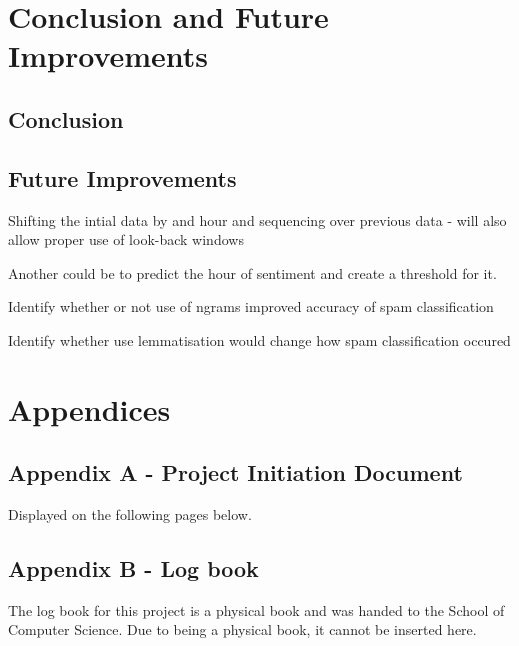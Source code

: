 \documentclass[oneside, 12pt]{article}
\begin{document}
	
	\newpage
	
	\section{Conclusion and Future Improvements}
		\subsection{Conclusion}
		\subsection{Future Improvements}
		Shifting the intial data by and hour and sequencing over previous data - will also allow proper use of look-back windows
		
		Another could be to predict the hour of sentiment and create a threshold for it.
		
		Identify whether or not use of ngrams improved accuracy of spam classification
		
		Identify whether use lemmatisation would change how spam classification occured
	\newpage
	
	\nocite{*}
	\printbibliography
	
	\newpage
	\section{Appendices}
		\subsection{Appendix A - Project Initiation Document}
		Displayed on the following pages below.
		
		\subsection{Appendix B - Log book}
		The log book for this project is a physical book and was handed to the School of Computer Science. Due to being a physical book, it cannot be inserted here.
	
\end{document}
